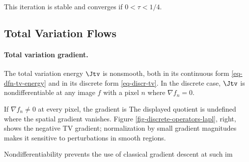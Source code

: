 This iteration is stable and converges if $0<\tau<1/4$.



                                                                      
\subsection{Total Variation Flows}

  
\paragraph{Total variation gradient.}

The total variation energy $\Jtv$ is nonsmooth, both in its continuous form \eqref{eq-dfn-tv-energy} and in its discrete form \eqref{eq-discr-tv}. In the discrete case, $\Jtv$ is nondifferentiable at any image $f$ with a pixel $n$ where $\nabla f_n = 0$.

If $\nabla f_n\neq0$ at every pixel, the gradient is
The displayed quotient is undefined where the spatial gradient vanishes. Figure \ref{fig-discrete-operators-lapl}, right, shows the negative TV gradient; normalization by small gradient magnitudes makes it sensitive to perturbations in smooth regions.

Nondifferentiability prevents the use of classical gradient descent at such im